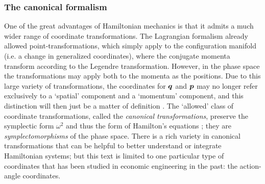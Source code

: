 \subsubsection{The canonical formalism}
One of the great advantages of Hamiltonian mechanics is that it admits a much wider range of coordinate transformations. The Lagrangian formalism already allowed point-transformations, which simply apply to the configuration manifold (i.e. a change in generalized coordinates), where the conjugate momenta transform according to the Legendre transformation. However, in the phase space the transformations may apply both to the momenta as the positions. Due to this large variety of transformations, the coordinates for \(\vb*{q}\) and \(\vb*{p}\) may no longer refer exclusively to a `spatial' component and a `momentum' component, and this distinction will then just be a matter of definition \cite{Landau1960}. The `allowed' class of coordinate transformations, called the \emph{canonical transformations}, preserve the symplectic form $\omega^2$ and thus the form of Hamilton's equations \cite{Arnold1989}; they are \emph{symplectomorphisms} of the phase space. There is a rich variety in canonical transformations that can be helpful to better understand or integrate Hamiltonian systems; but this text is limited to one particular type of coordinates that has been studied in economic engineering in the past: the action-angle coordinates.


